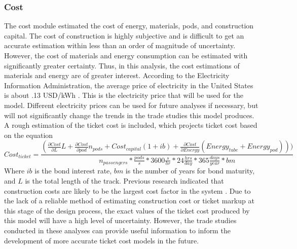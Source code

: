 \subsubsection{Cost}
	The cost module estimated the cost of energy, materials, pods, and construction capital. The cost of construction is highly subjective and is difficult to get an accurate estimation within less than an order of magnitude of uncertainty. However, the cost of materials and energy consumption can be estimated with significantly greater certainty. Thus, in this analysis, the cost estimations of materials and energy are of greater interest. According to the Electricity Information Administration, the average price of electricity in the United States is about .13 USD/kWh \cite{EIA}. This is the electricity price that will be used for the model. Different electricity prices can be used for future analyses if necessary, but will not significantly change the trends in the trade studies this model produces. A rough estimation of the ticket cost is included, which projects ticket cost based on the equation
	\begin{equation}
		\label{eq:ticket_cost}
		Cost_{ticket} = \frac{ (\frac{\partial Cost}{\partial L}L+\frac{\partial Cost }{\partial pod}n_{pods}+Cost_{capital} ( 1+ib ) + \frac{\partial Cost}{\partial Energy} (Energy_{tube} + Energy_{pod}  ))  )}{n_{passengers}*\frac{pods}{s}*3600\frac{s}{hr}*24\frac{hrs}{day}*365\frac{days}{year}*bm}
	\end{equation}
	Where $ib$ is the bond interest rate, $bm$ is the number of years for bond maturity, and $L$ is the total length of the track. Previous research indicated that construction costs are likely to be the largest cost factor in the system \cite{Musk}. Due to the lack of a reliable method of estimating construction cost or ticket markup at this stage of the design process, the exact values of the ticket cost produced by this model will have a high level of uncertainty. However, the trade studies conducted in these analyses can provide useful information to inform the development of more accurate ticket cost models in the future.